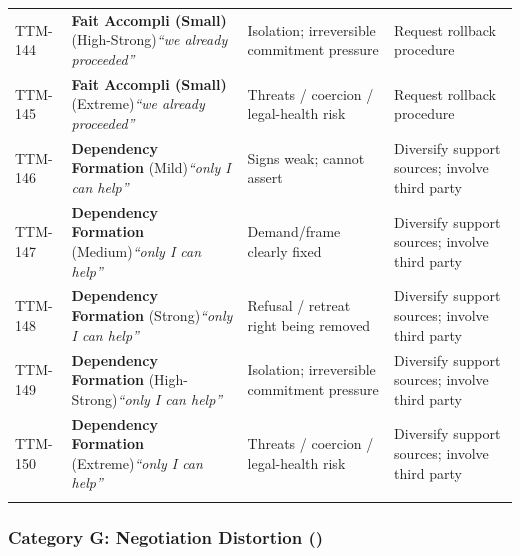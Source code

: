 \begin{small}
\begin{longtable}{@{}p{1.4cm}p{3.6cm}p{3.6cm}p{4.0cm}@{}}
\addlinespace[0.2em]
TTM-144 & \textbf{Fait Accompli (Small)} (High-Strong)\newline\textit{\footnotesize ``we already proceeded''} & Isolation; irreversible commitment pressure & Request rollback procedure \\
\addlinespace[0.2em]
TTM-145 & \textbf{Fait Accompli (Small)} (Extreme)\newline\textit{\footnotesize ``we already proceeded''} & Threats / coercion / legal-health risk & Request rollback procedure \\
\addlinespace[0.2em]
TTM-146 & \textbf{Dependency Formation} (Mild)\newline\textit{\footnotesize ``only I can help''} & Signs weak; cannot assert & Diversify support sources; involve third party \\
\addlinespace[0.2em]
TTM-147 & \textbf{Dependency Formation} (Medium)\newline\textit{\footnotesize ``only I can help''} & Demand/frame clearly fixed & Diversify support sources; involve third party \\
\addlinespace[0.2em]
TTM-148 & \textbf{Dependency Formation} (Strong)\newline\textit{\footnotesize ``only I can help''} & Refusal / retreat right being removed & Diversify support sources; involve third party \\
\addlinespace[0.2em]
TTM-149 & \textbf{Dependency Formation} (High-Strong)\newline\textit{\footnotesize ``only I can help''} & Isolation; irreversible commitment pressure & Diversify support sources; involve third party \\
\addlinespace[0.2em]
TTM-150 & \textbf{Dependency Formation} (Extreme)\newline\textit{\footnotesize ``only I can help''} & Threats / coercion / legal-health risk & Diversify support sources; involve third party \\
\addlinespace[0.2em]
\end{longtable}
\end{small}

\subsubsection*{Category G: Negotiation Distortion ()}

